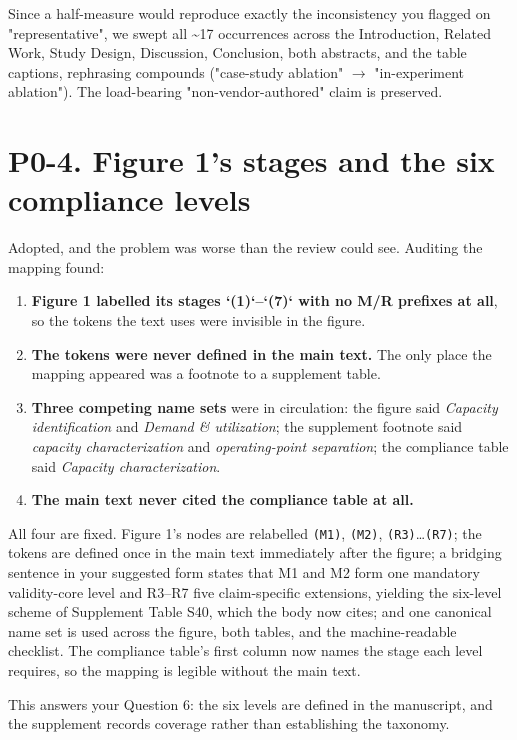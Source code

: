 \documentclass[11pt,a4paper]{article}
\begin{document}
Since a half-measure would reproduce exactly the inconsistency you flagged on "representative", we swept all \textasciitilde{}17 occurrences across the Introduction, Related Work, Study Design, Discussion, Conclusion, both abstracts, and the table captions, rephrasing compounds ("case-study ablation" $\to$ "in-experiment ablation"). The load-bearing "non-vendor-authored" claim is preserved.

\section*{P0-4. Figure 1's stages and the six compliance levels}

Adopted, and the problem was worse than the review could see. Auditing the mapping found:

\begin{enumerate}
  \item \textbf{Figure 1 labelled its stages `(1)`--`(7)` with no M/R prefixes at all}, so the tokens the text uses were invisible in the figure.
  \item \textbf{The tokens were never defined in the main text.} The only place the mapping appeared was a footnote to a supplement table.
  \item \textbf{Three competing name sets} were in circulation: the figure said \emph{Capacity identification} and \emph{Demand \& utilization}; the supplement footnote said \emph{capacity characterization} and \emph{operating-point separation}; the compliance table said \emph{Capacity characterization}.
  \item \textbf{The main text never cited the compliance table at all.}
\end{enumerate}

All four are fixed. Figure 1's nodes are relabelled \texttt{(M1)}, \texttt{(M2)}, \texttt{(R3)}\ldots{}\texttt{(R7)}; the tokens are defined once in the main text immediately after the figure; a bridging sentence in your suggested form states that M1 and M2 form one mandatory validity-core level and R3--R7 five claim-specific extensions, yielding the six-level scheme of Supplement Table S40, which the body now cites; and one canonical name set is used across the figure, both tables, and the machine-readable checklist. The compliance table's first column now names the stage each level requires, so the mapping is legible without the main text.

This answers your Question 6: the six levels are defined in the manuscript, and the supplement records coverage rather than establishing the taxonomy.
\end{document}
